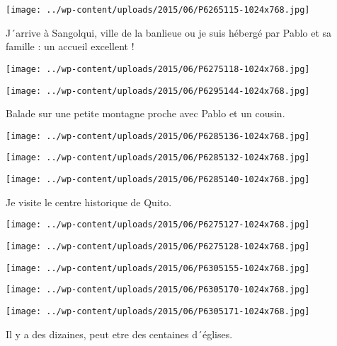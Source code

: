  \newline
\centerline{\texttt{[image: ../wp-content/uploads/2015/06/P6265115-1024x768.jpg]} } 
 \newline
 J´arrive à Sangolqui, ville de la banlieue ou je suis hébergé par Pablo et sa famille : un accueil excellent ! \newline
 \newline
\centerline{\texttt{[image: ../wp-content/uploads/2015/06/P6275118-1024x768.jpg]} } 
 \newline
 \newline
\centerline{\texttt{[image: ../wp-content/uploads/2015/06/P6295144-1024x768.jpg]} } 
 \newline
 Balade sur une petite montagne proche avec Pablo et un cousin. \newline
 \newline
\centerline{\texttt{[image: ../wp-content/uploads/2015/06/P6285136-1024x768.jpg]} } 
 \newline
 \newline
\centerline{\texttt{[image: ../wp-content/uploads/2015/06/P6285132-1024x768.jpg]} } 
 \newline
 \newline
\centerline{\texttt{[image: ../wp-content/uploads/2015/06/P6285140-1024x768.jpg]} } 
 \newline
 Je visite le centre historique de Quito. \newline
 \newline
\centerline{\texttt{[image: ../wp-content/uploads/2015/06/P6275127-1024x768.jpg]} } 
 \newline
 \newline
\centerline{\texttt{[image: ../wp-content/uploads/2015/06/P6275128-1024x768.jpg]} } 
 \newline
 \newline
\centerline{\texttt{[image: ../wp-content/uploads/2015/06/P6305155-1024x768.jpg]} } 
 \newline
 \newline
\centerline{\texttt{[image: ../wp-content/uploads/2015/06/P6305170-1024x768.jpg]} } 
 \newline
 \newline
\centerline{\texttt{[image: ../wp-content/uploads/2015/06/P6305171-1024x768.jpg]} } 
 \newline
 Il y a des dizaines, peut etre des centaines d´églises. \newline
